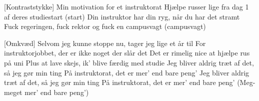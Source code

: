 \documentclass[a4paper,11pt]{article}
\begin{document}
\begin{song}
[Kontraststykke] Min motivation for et instruktorat
Hjælpe russer lige fra dag 1 af deres studiestart (start)
 Din instruktor har din ryg, når du har det stramt
Fuck regeringen, fuck rektor og fuck en campusvagt
(campusvagt)

[Omkvæd] Selvom jeg kunne stoppe nu, tager jeg lige et år til
For instruktorjobbet, der er ikke noget der slår det
Det er rimelig nice at hjælpe rus på uni
Plus at lave skejs, ik' blive færdig med studie
Jeg bliver aldrig træt af det, så jeg gør min ting
På instruktorat, det er mer' end bare peng’
Jeg bliver aldrig træt af det, så jeg gør min ting
På instruktorat, det er mer' end bare peng’
(Meg- meget mer' end bare peng’)

    
\end{song}
\end{document}
